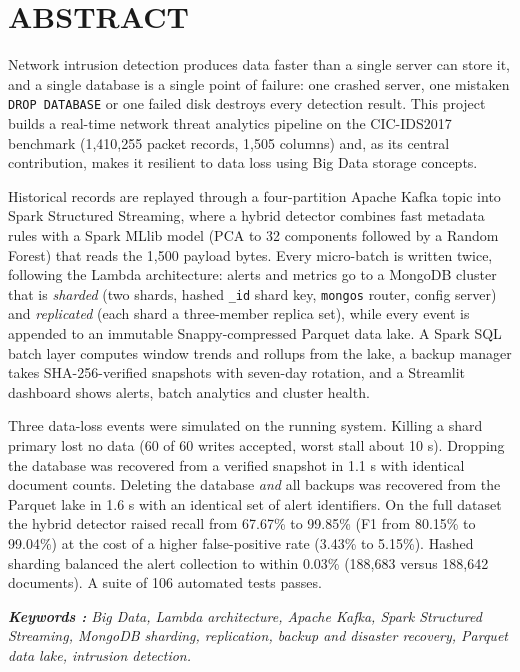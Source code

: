 \chapter*{ABSTRACT}%
\begin{justify}
Network intrusion detection produces data faster than a single server can store it, and a single database is a single point of failure: one crashed server, one mistaken \texttt{DROP DATABASE} or one failed disk destroys every detection result. This project builds a real-time network threat analytics pipeline on the CIC-IDS2017 benchmark (1,410,255 packet records, 1,505 columns) and, as its central contribution, makes it resilient to data loss using Big Data storage concepts.

Historical records are replayed through a four-partition Apache Kafka topic into Spark Structured Streaming, where a hybrid detector combines fast metadata rules with a Spark MLlib model (PCA to 32 components followed by a Random Forest) that reads the 1,500 payload bytes. Every micro-batch is written twice, following the Lambda architecture: alerts and metrics go to a MongoDB cluster that is \emph{sharded} (two shards, hashed \texttt{\_id} shard key, \texttt{mongos} router, config server) and \emph{replicated} (each shard a three-member replica set), while every event is appended to an immutable Snappy-compressed Parquet data lake. A Spark SQL batch layer computes window trends and rollups from the lake, a backup manager takes SHA-256-verified snapshots with seven-day rotation, and a Streamlit dashboard shows alerts, batch analytics and cluster health.

Three data-loss events were simulated on the running system. Killing a shard primary lost no data (60 of 60 writes accepted, worst stall about 10 s). Dropping the database was recovered from a verified snapshot in 1.1 s with identical document counts. Deleting the database \emph{and} all backups was recovered from the Parquet lake in 1.6 s with an identical set of alert identifiers. On the full dataset the hybrid detector raised recall from 67.67\% to 99.85\% (F1 from 80.15\% to 99.04\%) at the cost of a higher false-positive rate (3.43\% to 5.15\%). Hashed sharding balanced the alert collection to within 0.03\% (188,683 versus 188,642 documents). A suite of 106 automated tests passes.

\end{justify}

\begin{flushleft}
\vspace{1cm}

\textsl {\textbf {Keywords :} Big Data, Lambda architecture, Apache Kafka, Spark Structured Streaming, MongoDB sharding, replication, backup and disaster recovery, Parquet data lake, intrusion detection.}

\end{flushleft}

